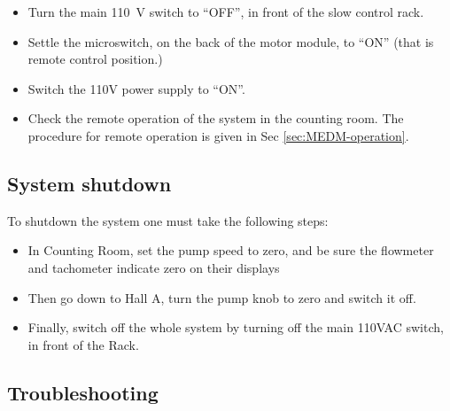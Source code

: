 {\begin{itemize}
\begin{itemize}
\item Turn the main 110~V switch to ``OFF'', in front of
the slow control rack.
\item Settle the microswitch, on the back of the motor module, to ``ON''
(that is remote control position.)
\item Switch the 110V power supply to ``ON''.
\item Check the remote operation of the system in the counting room. The
procedure for remote operation is given in Sec \ref{sec:MEDM-operation}.
\end{itemize}
\end{itemize}

\subsection{System shutdown}

To shutdown the system one must take the following steps: 

\begin{itemize}
\item In Counting Room, set the pump speed to zero, and be sure the flowmeter
and tachometer indicate zero on their displays
\item Then go down to Hall A, turn the pump knob to zero and switch it off.
\item Finally, switch off the whole system by turning off the main 110VAC
switch, in front of the Rack.
\end{itemize}

\subsection{Troubleshooting}

}
